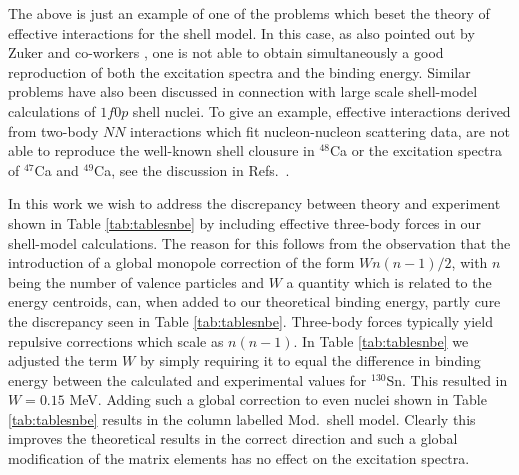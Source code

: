 \documentclass[twoside,12pt]{article}
\begin{document}
The above is just an example of one of the problems which beset the theory
of effective interactions for the shell model. In this case, as also
pointed out by Zuker and co-workers \cite{zuker1},
one is not able to obtain simultaneously a good reproduction
of both the excitation spectra and the binding energy. Similar problems
have also been discussed in connection with large scale shell-model
calculations of $1f0p$ shell nuclei. To give an example, effective
interactions derived from two-body $NN$ interactions which fit 
nucleon-nucleon scattering data, are not able to reproduce the 
well-known shell clousure in $^{48}$Ca or the excitation spectra 
of $^{47}$Ca and $^{49}$Ca, see the discussion in Refs.\ \cite{alex,hko95,zuker1}.

In this work we wish to address the discrepancy between theory and experiment
shown in Table \ref{tab:tablesnbe} by including effective three-body
forces in our shell-model calculations. The reason for this follows
from the observation that the introduction of a global monopole correction
of the form $Wn(n-1)/2$, with $n$ being the number of valence particles and
$W$ a quantity which is related to the energy centroids, 
can, when added to our theoretical binding energy, partly cure the 
discrepancy seen in Table \ref{tab:tablesnbe}. Three-body forces
typically yield repulsive corrections which scale as $n(n-1)$.  
In Table \ref{tab:tablesnbe} we adjusted the term $W$ by simply requiring
it to equal the difference in binding energy between the calculated and
experimental values for $^{130}$Sn. This resulted in $W=0.15$ MeV.
Adding such a global correction to even nuclei shown in Table  
\ref{tab:tablesnbe} results in the column labelled Mod.\ shell model.
Clearly this improves the theoretical results in the correct direction
and such a global modification of the matrix elements has no
effect on the excitation spectra. 
\end{document}
